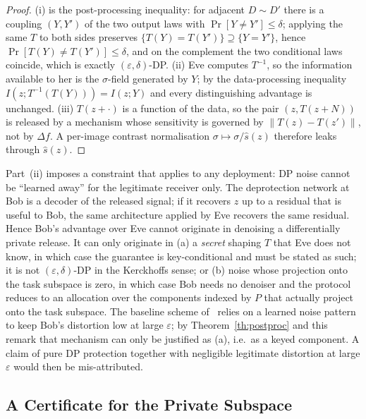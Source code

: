 \begin{proof}
(i) is the post-processing inequality: for adjacent $D\sim D'$ there is a
coupling $(Y,Y')$ of the two output laws with $\Pr[Y\neq Y']\le\delta$;
applying the same $T$ to both sides preserves
$\{T(Y)=T(Y')\}\supseteq\{Y=Y'\}$, hence
$\Pr[T(Y)\neq T(Y')]\le\delta$, and on the complement the two conditional
laws coincide, which is exactly $(\varepsilon,\delta)$-DP.
(ii) Eve computes $T^{-1}$, so the information available to her is the
$\sigma$-field generated by $Y$; by the data-processing inequality
$I(z;T^{-1}(T(Y)))=I(z;Y)$ and every distinguishing advantage is unchanged.
(iii) $T(z+\cdot)$ is a function of the data, so the pair
$(z,T(z+N))$ is released by a mechanism whose sensitivity is governed by
$\|T(z)-T(z')\|$, not by $\Delta f$. A per-image contrast normalisation
$\sigma\mapsto\sigma/\widehat{s}(z)$ therefore leaks through
$\widehat{s}(z)$.
\end{proof}

\begin{remark}
\label{rm:tension}
Part~(ii) imposes a constraint that applies to any deployment: DP noise cannot
be
``learned away'' for the legitimate receiver only. The deprotection network at
Bob is a decoder of the released signal; if it recovers $z$ up to a residual
that is useful to Bob, the same architecture applied by Eve recovers the same
residual. Hence Bob's advantage over Eve cannot originate in denoising a
differentially private release. It can only originate in
(a) a \emph{secret} shaping $T$ that Eve does not know, in which case the
guarantee is key-conditional and must be stated as such; it is not
$(\varepsilon,\delta)$-DP in the Kerckhoffs sense; or
(b) noise whose projection onto the task subspace is zero, in which case Bob
needs no denoiser and the protocol reduces to an allocation over the
components indexed by $P$ that actually project onto the task subspace.
The baseline scheme of~\cite{arXiv2510} relies on a learned noise pattern to
keep Bob's distortion low at large $\varepsilon$; by
Theorem~\ref{th:postproc} and this remark that mechanism can only be justified
as (a), i.e.\ as a keyed component. A claim of pure DP protection together
with negligible legitimate distortion at large $\varepsilon$ would then be
mis-attributed.
\end{remark}

\subsection{A Certificate for the Private Subspace}
\label{sec:certificate}

